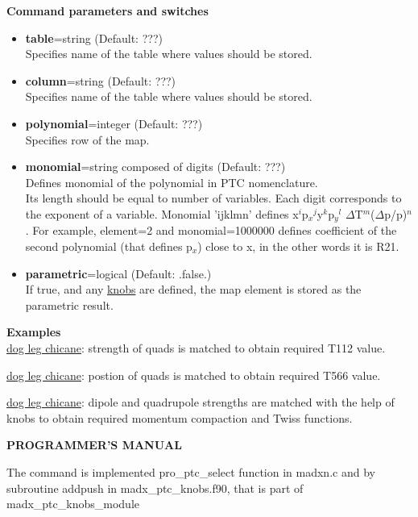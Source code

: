 {\bf Command parameters and switches}

\begin{itemize}
   \item {\bf table}=string (Default: ???)\\
     Specifies name of the table where values should be stored.   
   \item {\bf column}=string (Default: ???)\\     
     Specifies name of the table where values should be stored.   
   \item {\bf polynomial}=integer (Default: ???)\\
     Specifies row of the map.   
   \item {\bf monomial}=string composed of digits (Default: ???)\\
     Defines monomial of the polynomial in PTC nomenclature. \\
     Its length should be equal to number of variables. Each digit
     corresponds to the exponent of a variable. Monomial 'ijklmn'
     defines x$^i$p$_x$$^j$y$^k$p$_y$$^l$
     $\Delta$T$^m$($\Delta$p/p)$^n$. For example, element=2 and
     monomial=1000000 defines coefficient of the second polynomial (that
     defines p$_x$) close to x, in the other words it is R21.  
   \item{\bf parametric}=logical (Default: .false.)\\
     If true, and any \href{PTC_Knob.html}{knobs} are defined, the
     map element is stored as the parametric result.            
\end{itemize}


{\bf Examples}\\

\href{http://cern.ch/frs/mad-X_examples/ptc_madx_interface/ptc_secordmatch/chicane.madx}{dog
  leg chicane}: strength of quads is matched to obtain required T112
value.    

\href{http://cern.ch/frs/mad-X_examples/ptc_madx_interface/eplacement/chicane.madx}{dog
  leg chicane}: postion of quads is matched to obtain required T566
value.   

\href{http://cern.ch/frs/mad-X_examples/ptc_madx_interface/matchwithknobs/matchwithknobs.madx}{dog
  leg chicane}: dipole and quadrupole strengths are matched with the
help of knobs to obtain required momentum compaction and Twiss
functions.   


{\bf PROGRAMMER'S MANUAL} 

The command is implemented pro\_ptc\_select function in madxn.c and  by
subroutine addpush in madx\_ptc\_knobs.f90, that is part of
madx\_ptc\_knobs\_module   

